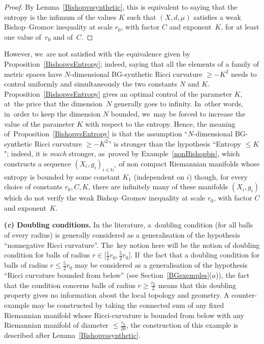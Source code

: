 \documentclass[pdftex]{sigma}
\numberwithin{equation}{section}
\newcommand{\N}{\mathbb{N}}
\begin{document}
\begin{proof}
By Lemma~\ref{Bishopvssynthetic}, this is equivalent to saying that the entropy is the infimum of the values $K$ such that $ (X,d, \mu) $ satisfies a weak
Bishop--Gromov inequality at scale $r_0$, with factor $C$ and exponent~$K$, for at least one value of~$r_0$ and of~$C$.
\end{proof}

However, we~are not satisfied with the equivalence given by Proposition~\ref{BishopvsEntropy}; indeed, saying that all the elements of a family of metric
spaces have $N$-dimensional BG-synthetic Ricci curvature \mbox{$\ge -K^2$} needs
to control uniformly and simultaneously the two constants $N$ and $K$.
Proposition~\ref{BishopvsEntropy} gives an optimal control of the parameter $K$, at~the price that the dimension~$N$ generally goes to infinity. In~other words, in~order to keep the dimension $N$ bounded, we~may be forced to increase the value of the parameter $K$ with respect to the entropy.
Hence, the meaning of~Proposition~\ref{BishopvsEntropy} is that the assumption ``$N$-dimensional BG-synthetic Ricci curvature $\ge -K^2$'' is
stronger than the hypothesis ``Entropy $\le K$"; indeed, it is \emph{much} stronger, as~proved by Example~\ref{nonBishopbis}, which constructs a
sequence $(X_i,g_i)_{i \in \N^*}$ of non compact Riemannian manifolds whose entropy is bounded by some constant $K_1$ (independent on $i$) though,
for every choice of constants $r_0, C, K$, there are infinitely many of these manifolds $(X_i, g_i)$ which do not verify the weak Bishop--Gromov inequality
at scale $r_0$, with factor $C$ and exponent~$K$.

\medskip\noindent
{\bf (\emph{c}) Doubling conditions.}
In the literature, a~doubling condition (for all balls of every radius) is generally considered as a generalisation of the hypothesis ``nonnegative
Ricci curvature''. The~key notion here will be the notion of doubling condition for balls of radius $r \in \big[ \frac{1}{2}r_0, \frac{5}{2} r_0\big]$. If~the fact
that a doubling condition for balls of radius $r\leq\frac{5}{2} r_0$ may be considered as a generalisation of the hypothesis ``Ricci curvature bounded from below'' (see Section~\ref{BGexemples}($a$)), the fact that the condition concerns balls of radius $r \ge\frac{r_0}{2}$ means that
this doubling property gives no information about the local topology and geometry. A counter-example may be constructed by taking the connected
sum of any fixed Riemannian manifold whose Ricci-curvature is bounded from below with any Riemannian manifold of diameter $\le \frac{r_0}{20}$, the construction of this example is described after Lemma~\ref{Bishopvssynthetic}.
\end{document}

